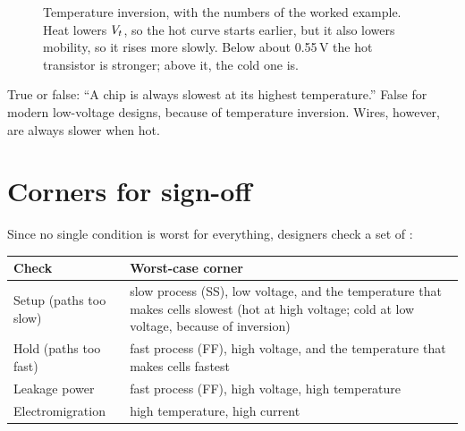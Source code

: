 \begin{figure}[h]
\centering
{}
\caption{Temperature inversion, with the numbers of the worked example. Heat lowers $V_{t}$, so the hot curve starts earlier, but it also lowers mobility, so it rises more slowly. Below about 0.55\,V the hot transistor is stronger; above it, the cold one is.}
\label{fig:tempinv}
\end{figure}

\begin{trap}
True or false: ``A chip is always slowest at its highest temperature.'' False for modern low-voltage designs, because of temperature inversion. Wires, however, are always slower when hot.
\end{trap}

\section{Corners for sign-off}

Since no single condition is worst for everything, designers check a set of :

\begin{center}
\begin{tabularx}{\linewidth}{>{\raggedright\arraybackslash}p{3.2cm}>{\raggedright\arraybackslash}X}
\toprule
Check & Worst-case corner \\
\midrule
Setup (paths too slow) & slow process (SS), low voltage, and the temperature that makes cells slowest (hot at high voltage; cold at low voltage, because of inversion) \\
Hold (paths too fast) & fast process (FF), high voltage, and the temperature that makes cells fastest \\
Leakage power & fast process (FF), high voltage, high temperature \\
Electromigration & high temperature, high current \\
\bottomrule
\end{tabularx}
\end{center}

